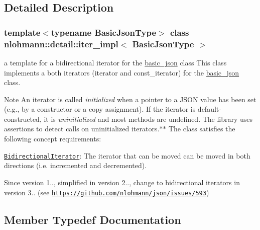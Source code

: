 \subsection{Detailed Description}
\subsubsection*{template$<$typename Basic\+Json\+Type$>$\newline
class nlohmann\+::detail\+::iter\+\_\+impl$<$ Basic\+Json\+Type $>$}

a template for a bidirectional iterator for the \mbox{\hyperlink{classnlohmann_1_1basic__json}{basic\+\_\+json}} class This class implements a both iterators (iterator and const\+\_\+iterator) for the \mbox{\hyperlink{classnlohmann_1_1basic__json}{basic\+\_\+json}} class. 

\begin{DoxyNote}{Note}
An iterator is called {\itshape initialized} when a pointer to a J\+S\+ON value has been set (e.\+g., by a constructor or a copy assignment). If the iterator is default-\/constructed, it is {\itshape uninitialized} and most methods are undefined. The library uses assertions to detect calls on uninitialized iterators.$\ast$$\ast$  The class satisfies the following concept requirements\+:
\begin{DoxyItemize}
\item \href{https://en.cppreference.com/w/cpp/named_req/BidirectionalIterator}{\tt Bidirectional\+Iterator}\+: The iterator that can be moved can be moved in both directions (i.\+e. incremented and decremented). 
\end{DoxyItemize}
\end{DoxyNote}
\begin{DoxySince}{Since}
version 1.., simplified in version 2.., change to bidirectional iterators in version 3.. (see \href{https://github.com/nlohmann/json/issues/593}{\tt https\+://github.\+com/nlohmann/json/issues/593}) 
\end{DoxySince}


\subsection{Member Typedef Documentation}
\mbox{\label{classnlohmann_1_1detail_1_1iter__impl_ad9e091f5c70b34b5b1abc1ab15fd9106}} 
